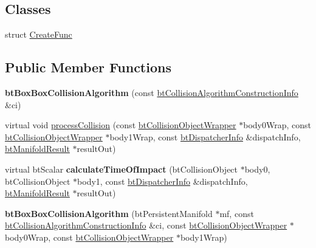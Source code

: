 \subsection*{Classes}
\begin{DoxyCompactItemize}
\item 
struct \hyperlink{structbtBoxBoxCollisionAlgorithm_1_1CreateFunc}{Create\+Func}
\end{DoxyCompactItemize}
\subsection*{Public Member Functions}
\begin{DoxyCompactItemize}
\item 
\mbox{\label{classbtBoxBoxCollisionAlgorithm_a7e3155fbdc5ffe12264832ace89ebd39}} 
{\bfseries bt\+Box\+Box\+Collision\+Algorithm} (const \hyperlink{structbtCollisionAlgorithmConstructionInfo}{bt\+Collision\+Algorithm\+Construction\+Info} \&ci)
\item 
virtual void \hyperlink{classbtBoxBoxCollisionAlgorithm_aadde989098617a7679a8d907f4144adb}{process\+Collision} (const \hyperlink{structbtCollisionObjectWrapper}{bt\+Collision\+Object\+Wrapper} $\ast$body0\+Wrap, const \hyperlink{structbtCollisionObjectWrapper}{bt\+Collision\+Object\+Wrapper} $\ast$body1\+Wrap, const \hyperlink{structbtDispatcherInfo}{bt\+Dispatcher\+Info} \&dispatch\+Info, \hyperlink{classbtManifoldResult}{bt\+Manifold\+Result} $\ast$result\+Out)
\item 
\mbox{\label{classbtBoxBoxCollisionAlgorithm_a44e93ae3a65afdf66029f66056fb7f57}} 
virtual bt\+Scalar {\bfseries calculate\+Time\+Of\+Impact} (bt\+Collision\+Object $\ast$body0, bt\+Collision\+Object $\ast$body1, const \hyperlink{structbtDispatcherInfo}{bt\+Dispatcher\+Info} \&dispatch\+Info, \hyperlink{classbtManifoldResult}{bt\+Manifold\+Result} $\ast$result\+Out)
\item 
\mbox{\label{classbtBoxBoxCollisionAlgorithm_a40dbeba5e546755c3e3bc931bf658a9e}} 
{\bfseries bt\+Box\+Box\+Collision\+Algorithm} (bt\+Persistent\+Manifold $\ast$mf, const \hyperlink{structbtCollisionAlgorithmConstructionInfo}{bt\+Collision\+Algorithm\+Construction\+Info} \&ci, const \hyperlink{structbtCollisionObjectWrapper}{bt\+Collision\+Object\+Wrapper} $\ast$body0\+Wrap, const \hyperlink{structbtCollisionObjectWrapper}{bt\+Collision\+Object\+Wrapper} $\ast$body1\+Wrap)

\end{DoxyCompactItemize}
